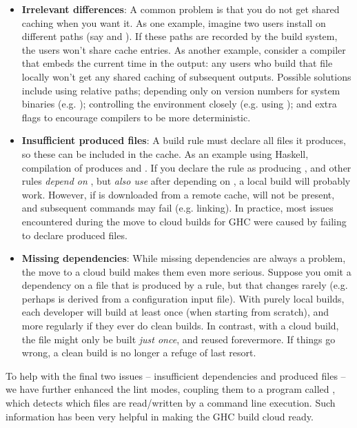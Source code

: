 \begin{itemize}
\item \textbf{Irrelevant differences}: A common problem is that you do not get
      shared caching when you want it. As one example, imagine two users install
       on different paths (say  and ).
      If these paths are recorded by the build system, the users won't share
      cache entries. As another example, consider a compiler that embeds the current time
      in the output: any users who build that file locally won't get any shared
      caching of subsequent outputs. Possible solutions include using relative paths;
      depending only on version numbers for system binaries (e.g. );
      controlling the environment closely (e.g. using \Nix); and extra flags to
      encourage compilers to be more deterministic.
\item \textbf{Insufficient produced files}: A build rule must declare all files
      it produces, so these can be included in the cache.
      As an example using Haskell, compilation of  produces
       and . If you declare the rule as producing ,
      and other rules \emph{depend on} , but \emph{also use}  after
      depending on , a local build will probably work. However,
      if  is downloaded from a remote cache,  will not be present,
      and subsequent commands may fail (e.g. linking). In practice, most issues encountered
      during the move to cloud builds for GHC were caused by failing to declare produced
      files.
\item \textbf{Missing dependencies}: While missing dependencies are
      always a problem, the move to a cloud build makes them even more serious.
      Suppose you omit a dependency on a file  that is produced by a rule,
      but that changes rarely (e.g. perhaps  is derived from
      a configuration input file).
      With purely local builds, each developer will build  at least once (when
      starting from scratch), and more regularly if they ever do clean
      builds. In contrast, with a cloud build, the file might only be built
      \emph{just once}, and reused forevermore. If things go wrong, a clean build
      is no longer a refuge of last resort.
\end{itemize}

To help with the final two issues -- insufficient dependencies and produced
files -- we have further enhanced the \Shake lint modes, coupling them to a
program called , which detects which files are read/written by a
command line execution. Such information has been very helpful in making the GHC
build cloud ready.

